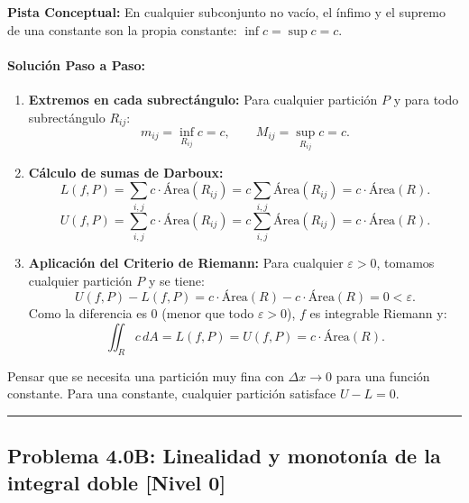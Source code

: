 \documentclass[11pt,a4paper]{article}
\begin{document}
\begin{tcolorbox}[colback=yellow!4,colframe=accentamber!70,arc=1mm,boxrule=0.5pt,left=3mm,right=3mm,top=1.5mm,bottom=1.5mm]
\textbf{Pista Conceptual:} En cualquier subconjunto no vacío, el ínfimo y el supremo de una constante son la propia constante: $\inf c = \sup c = c$.
\end{tcolorbox}

\paragraph{Solución Paso a Paso:}\par
\begin{enumerate}[label=\textbf{\arabic*.}]
\item \textbf{Extremos en cada subrectángulo:}
Para cualquier partición $P$ y para todo subrectángulo $R_{ij}$:
\[ m_{ij} = \inf_{R_{ij}} c = c, \qquad M_{ij} = \sup_{R_{ij}} c = c. \]
\item \textbf{Cálculo de sumas de Darboux:}
\[ L(f,P) = \sum_{i,j} c \cdot \text{Área}(R_{ij}) = c \sum_{i,j} \text{Área}(R_{ij}) = c \cdot \text{Área}(R). \]
\[ U(f,P) = \sum_{i,j} c \cdot \text{Área}(R_{ij}) = c \sum_{i,j} \text{Área}(R_{ij}) = c \cdot \text{Área}(R). \]
\item \textbf{Aplicación del Criterio de Riemann:}
Para cualquier $\varepsilon > 0$, tomamos cualquier partición $P$ y se tiene:
\[ U(f,P) - L(f,P) = c \cdot \text{Área}(R) - c \cdot \text{Área}(R) = 0 < \varepsilon. \]
Como la diferencia es 0 (menor que todo $\varepsilon > 0$), $f$ es integrable Riemann y:
\[ \iint_R c \, dA = L(f,P) = U(f,P) = c \cdot \text{Área}(R). \]
\end{enumerate}

\begin{trapbox}
Pensar que se necesita una partición muy fina con $\Delta x \to 0$ para una función constante. Para una constante, cualquier partición satisface $U-L=0$.
\end{trapbox}

\vspace{0.5cm}
\hrule
\vspace{0.5cm}
\subsection*{Problema 4.0B: Linealidad y monotonía de la integral doble \hfill \color{teal}\small[Nivel 0]}
\end{document}
